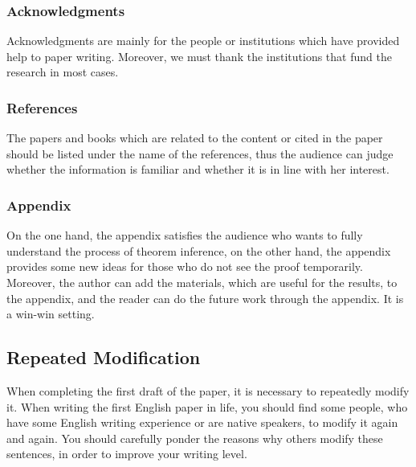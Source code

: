 \subsubsection{Acknowledgments}
Acknowledgments are mainly for the people or institutions which have provided help to paper writing. Moreover, we must thank the institutions that fund the research in most cases.

\subsubsection{References}
The papers and books which are related to the content or cited in the paper should be listed under the name of the references, thus the audience can judge whether the information is familiar and whether it is in line with her interest.

\subsubsection{Appendix}
On the one hand, the appendix satisfies the audience who wants to fully understand the process of theorem inference, on the other hand, the appendix provides some new ideas for those who do not see the proof temporarily. Moreover, the author can add the materials, which are useful for the results, to the appendix, and the reader can do the future work through the appendix. It is a win-win setting.

\subsection{Repeated Modification}
When completing the first draft of the paper, it is necessary to repeatedly modify it. When writing the first English paper in life, you should find some people, who have some English writing experience or are native speakers, to modify it again and again. You should carefully ponder the reasons why others modify these sentences, in order to improve your writing level.



\nocite{2013数学之英文写作}

